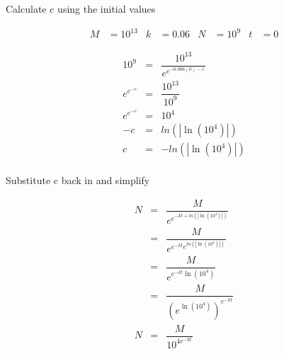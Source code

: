 \clearpage

Calculate c using the initial values

\begin{align*}
    M &= 10^{13} & k &= 0.06 & N &= 10^9 & t &= 0
\end{align*}

\begin{eqnarray*}
10^9        &=& \dfrac{10^{13}}{e^{e^{-0.006(0) - c}}} \\
e^{e^{-c}}  &=& \dfrac{10^{13}}{10^9} \\
e^{e^{-c}}  &=& {10^4} \\
-c          &=& ln\left(\left|\ln\left({10^4}\right)\right|\right) \\
c           &=& -ln\left(\left|\ln\left({10^4}\right)\right|\right) \\
\end{eqnarray*}

Substitute c back in and simplify

\begin{eqnarray*}
N &=& \dfrac{M}{e^{e^{-kt + ln\left(\left|\ln\left({10^4}\right)\right|\right)}}} \\
  &=& \dfrac{M}{e^{e^{-kt} e^{ln\left(\left|\ln\left({10^4}\right)\right|\right)}}} \\
  &=& \dfrac{M}{e^{e^{-kt} \ln\left({10^4}\right)}} \\
  &=& \dfrac{M}{(e^{\ln\left({10^4}\right)})^{e^{-kt}}} \\
N  &=& \dfrac{M}{10^{4e^{-kt}}}
\end{eqnarray*}

\clearpage